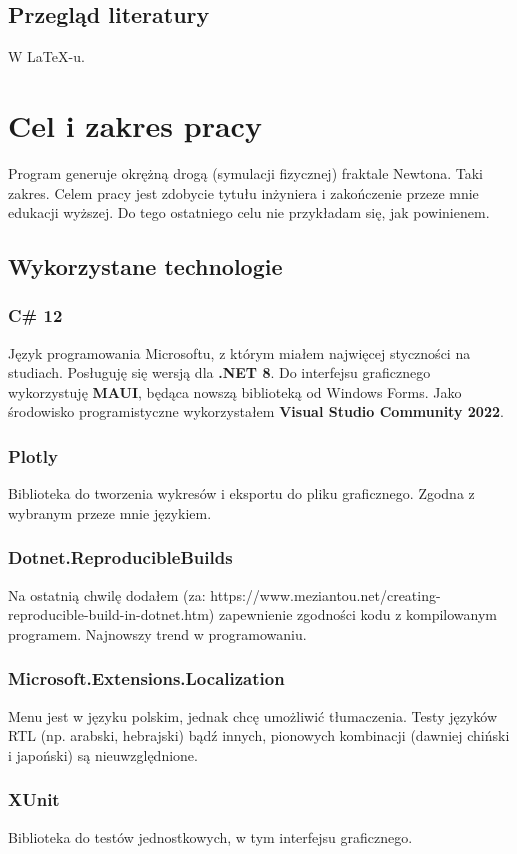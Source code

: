 \documentclass{SGGW-thesis}
\begin{document}
\section{Przegląd literatury}
W \LaTeX-u.\cite{talbot2013}

\chapter{Cel i zakres pracy}
Program generuje okrężną drogą (symulacji fizycznej) fraktale Newtona. Taki zakres. Celem pracy jest zdobycie tytułu inżyniera i zakończenie przeze mnie edukacji wyższej. Do tego ostatniego celu nie przykładam się, jak powinienem.
\section{Wykorzystane technologie}

\subsection{C\# 12}
Język programowania Microsoftu, z którym miałem najwięcej styczności na studiach. Posługuję się wersją dla \textbf{.NET 8}. Do interfejsu graficznego wykorzystuję \textbf{MAUI}, będąca nowszą biblioteką od Windows Forms. Jako środowisko programistyczne wykorzystałem \textbf{Visual Studio Community 2022}.
\subsection{Plotly}
Biblioteka do tworzenia wykresów i eksportu do pliku graficznego. Zgodna z wybranym przeze mnie językiem.
\subsection{Dotnet.ReproducibleBuilds}
Na ostatnią chwilę dodałem  (za: https://www.meziantou.net/creating-reproducible-build-in-dotnet.htm) zapewnienie zgodności kodu z kompilowanym programem. Najnowszy trend w programowaniu.
\subsection{Microsoft.Extensions.Localization}
Menu jest w języku polskim, jednak chcę umożliwić tłumaczenia. Testy języków RTL (np. arabski, hebrajski) bądź innych, pionowych kombinacji (dawniej chiński i japoński) są nieuwzględnione.
\subsection{XUnit}
Biblioteka do testów jednostkowych, w tym interfejsu graficznego.
\end{document}
